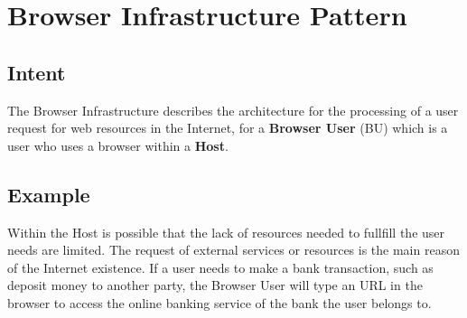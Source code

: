\documentclass{sig-alternate-05-2015}
\begin{document}



\section*{Browser Infrastructure Pattern}

  \subsection*{Intent}

  The Browser Infrastructure describes the architecture for the processing of a user request for web resources in the Internet, for a \textbf{Browser User} (BU) which is a user who uses a browser within a \textbf{Host}.

  \subsection*{Example}
  Within the Host is possible that the lack of resources needed to fullfill the user needs are limited. The request of external services or resources is the main reason of the Internet existence. If a user needs to make a bank transaction, such as deposit money to another party, the Browser User will type an URL in the browser to access the online banking service of the bank the user belongs to.
  
\end{document}
